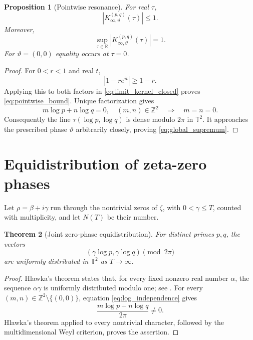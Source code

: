 \documentclass[11pt]{amsart}
\numberwithin{equation}{section}
\theoremstyle{plain}
\newtheorem{theorem}{Theorem}[section]
\newtheorem{proposition}[theorem]{Proposition}
\theoremstyle{definition}
\theoremstyle{remark}
\newcommand{\Torus}{\mathbb T}
\begin{document}
\begin{proposition}[Pointwise resonance]
\label{prop:pointwise_resonance}
For real $\tau$,
\begin{equation}
\left|K_{\infty,\vartheta}^{(p,q)}(\tau)\right|\leq1.
\label{eq:pointwise_bound}
\end{equation}
Moreover,
\begin{equation}
\sup_{\tau\in\mathbb R}
\left|K_{\infty,\vartheta}^{(p,q)}(\tau)\right|=1.
\label{eq:global_supremum}
\end{equation}
For $\vartheta=(0,0)$ equality occurs at $\tau=0$.
\end{proposition}

\begin{proof}
For $0<r<1$ and real $t$,
\begin{equation}
|1-re^{it}|\geq1-r.
\label{eq:elementary_denominator_bound}
\end{equation}
Applying this to both factors in \eqref{eq:limit_kernel_closed} proves \eqref{eq:pointwise_bound}.  Unique factorization gives
\begin{equation}
m\log p+n\log q=0,\quad (m,n)\in\mathbb Z^2
\quad\Longrightarrow\quad
m=n=0.
\label{eq:log_independence}
\end{equation}
Consequently the line $\tau(\log p,\log q)$ is dense modulo $2\pi$ in $\Torus^2$.  It approaches the prescribed phase $\vartheta$ arbitrarily closely, proving \eqref{eq:global_supremum}.
\end{proof}

\section{Equidistribution of zeta-zero phases}
\label{sec:zero_equidistribution}

Let $\rho=\beta+i\gamma$ run through the nontrivial zeros of $\zeta$, with $0<\gamma\leq T$, counted with multiplicity, and let $N(T)$ be their number.

\begin{theorem}[Joint zero-phase equidistribution]
\label{thm:joint_equidistribution}
For distinct primes $p,q$, the vectors
\begin{equation}
\left(\gamma\log p,\gamma\log q\right)\pmod{2\pi}
\label{eq:zero_phase_vectors}
\end{equation}
are uniformly distributed in $\Torus^2$ as $T\to\infty$.
\end{theorem}

\begin{proof}
Hlawka's theorem states that, for every fixed nonzero real number $\alpha$, the sequence $\alpha\gamma$ is uniformly distributed modulo one; see \cite{FordZaharescu2005}.  For every $(m,n)\in\mathbb Z^2\setminus\{(0,0)\}$, equation \eqref{eq:log_independence} gives
\begin{equation}
\frac{m\log p+n\log q}{2\pi}\neq0.
\label{eq:nonzero_character_frequency}
\end{equation}
Hlawka's theorem applied to every nontrivial character, followed by the multidimensional Weyl criterion, proves the assertion.
\end{proof}
\end{document}
